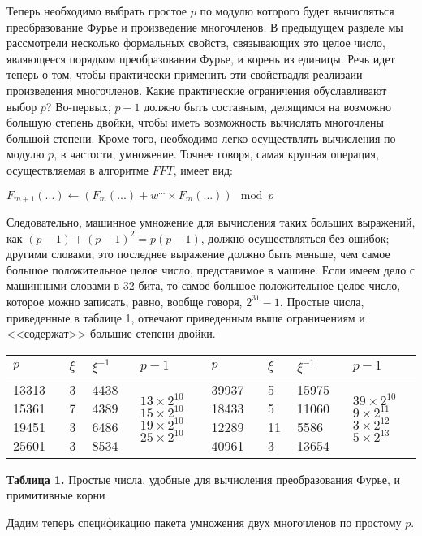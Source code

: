 \documentclass{mai_book}
\begin{document}
	\noindent Теперь необходимо выбрать простое $p$ по модулю которого будет вычисляться преобразование Фурье и произведение многочленов. В предыдущем разделе мы рассмотрели несколько формальных свойств, связывающих это целое число, являющееся порядком преобразования Фурье, и корень из единицы. Речь идет теперь о том, чтобы практически применить эти свойствадля реализаии произведения многочленов. Какие практические ограничения обуславливают выбор $p$? Во-первых, $p-1$ должно быть составным, делящимся на возможно большую степень двойки, чтобы иметь возможность вычислять многочлены большой степени. Кроме того, необходимо легко осуществлять вычисления по модулю $p$, в частости, умножение. Точнее говоря, самая крупная операция, осуществляемая в алгоритме $FFT$, имеет вид:
	\smallskip
	\begin{center}
	$F_{m+1}(...) \leftarrow (F_{m}(...) + w^{...} \times F_{m}(...)) \mod p$
	\end{center}
	\smallskip
	Следовательно, машинное умножение для вычисления таких больших выражений, как $(p-1) + (p-1)^2 = p(p-1)$, должно осуществляться без ошибок; другими словами, это последнее выражение должно быть меньше, чем самое большое положительное целое число, представимое в машине. Если имеем дело с машинными словами в 32 бита, то самое большое положительное целое число, которое можно записать, равно, вообще говоря, $2^{31} - 1$. Простые числа, приведенные в таблице 1, отвечают приведенным выше ограничениям и <<содержат>> большие степени двойки.
	\begin{center}
	\begin{tabular}[t]{|p{2em}|p{1em}|p{2em}|p{4em}|p{2em}|p{1em}|p{2em}|p{4em}|}
	\hline 
	$p$ & $\xi$ & $\xi^{-1}$ & $p-1$ & $p$ & $\xi$ & $\xi^{-1}$ & $p-1$\\
	\hline
	13313 15361 19451 25601 & 3 7 3 3 & 4438 4389 6486 8534 & $13 \times 2^{10}$  $15 \times 2^{10}$ $19 \times 2^{10}$ $25 \times 2^{10}$ & 39937 18433 12289 40961 & 5 5 11 3 & 15975 11060 5586 13654 & $39 \times 2^{10}$ $9 \times 2^{11}$ $3 \times 2^{12}$ $5 \times 2^{13}$ \\
	\hline
	\end{tabular}
	\end{center}
	\begin{center}
	{\bf Таблица 1.} Простые числа, удобные для вычисления преобразования Фурье, и примитивные корни
	\end{center}

	Дадим теперь спецификацию пакета умножения двух многочленов по простому $p$.
	
\end{document}
